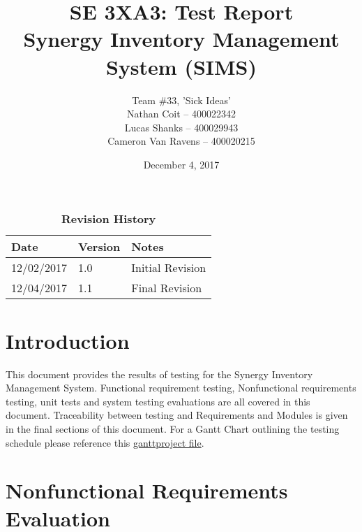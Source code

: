 \documentclass[12pt, titlepage]{article}
\title{SE 3XA3: Test Report\\Synergy Inventory Management System (SIMS)}
\author{Team \#33, 'Sick Ideas'
		\\ Nathan Coit -- 400022342
		\\ Lucas Shanks -- 400029943
		\\ Cameron Van Ravens -- 400020215
}
\date{December 4, 2017}
\begin{document}
\maketitle

\tableofcontents
\listoftables
\listoffigures

\begin{table}[bp]
\caption{\bf Revision History}
\begin{tabularx}{\textwidth}{p{3cm}p{2cm}X}
\toprule {\bf Date} & {\bf Version} & {\bf Notes}\\
\midrule
12/02/2017 & 1.0 & Initial Revision\\
12/04/2017 & 1.1 & Final Revision\\
\bottomrule
\end{tabularx}
\end{table}

\newpage


\section{Introduction}
This document provides the results of testing for the Synergy Inventory Management System. Functional requirement testing, Nonfunctional requirements testing, unit tests and system testing evaluations are all covered in this document. Traceability between testing and Requirements and Modules is given in the final sections of this document. For a Gantt Chart outlining the testing schedule please reference this \href{https://gitlab.cas.mcmaster.ca/coitn/se3xa3-fall2017/tree/dev/Doc/TestReport/gantt}{ganttproject file}.

\section{Nonfunctional Requirements Evaluation}
\end{document}
